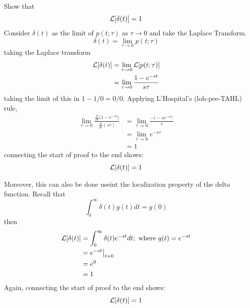 \documentclass[12pt,letter]{article}
\begin{document}
\begin{mdframed}[middlelinewidth=0.5mm]
\begin{center}
\end{center}
Show that
\begin{equation}
\mathcal{L}{\left[\delta(t)\right]} = 1
\end{equation}
Consider $\delta(t)$ as the limit of $p(t;\tau) $ as $\tau \rightarrow 0$ and take the Laplace Transform. 
\begin{equation}
\delta(t) = \lim\limits_{\tau \rightarrow 0} p(t;\tau) 
\end{equation}
taking the Laplace transform
\begin{align}
\mathcal{L}{\left[\delta(t)\right]} &= \lim\limits_{\tau \rightarrow 0} \mathcal{L}{\left[p(t;\tau)\right]} \\ \nonumber
&=  \lim\limits_{\tau \rightarrow 0} \frac{1-e^{-st}}{s \tau}
\end{align}
taking the limit of this in ${1-1}/0 = 0/0$. Applying L'Hospital's (loh-pee-TAHL) rule, 
\begin{align}
\lim\limits_{\tau \rightarrow 0} \frac{ \frac{\partial}{\partial \tau} \big(     1-e^{-s t}    \big)  }{ \frac{\partial}{\partial \tau} (s \tau)} &= \lim\limits_{\tau \rightarrow 0} \frac{- \big(-s e^{-s \tau \big)}}{s}  \\ \nonumber
&=  \lim\limits_{\tau \rightarrow 0} e^{-s \tau} \\ \nonumber
&= 1
\end{align}
connecting the start of proof to the end shows:
\begin{equation}
\mathcal{L}{\left[\delta(t)\right]} = 1
\end{equation}

Moreover, this can also be done useint the localization property of the delta function. Recall that
\begin{equation}
\int_{0}^{\infty} \delta(t) g(t) dt = g(0)
\end{equation}
then
\begin{align}
\mathcal{L}{\left[\delta(t)\right]} &= \int_{0}^{\infty} \delta(t) e^{-s t} dt; \text{ where } g(t) = e^{-s t} \\ \nonumber
&= e^{-s t}\big|_{t=0} \\ \nonumber
&= e^0 \\ \nonumber
&= 1
\end{align}
Again, connecting the start of proof to the end shows:
\begin{equation}
\mathcal{L}{\left[\delta(t)\right]} = 1
\end{equation}
\end{mdframed}
\end{document}
